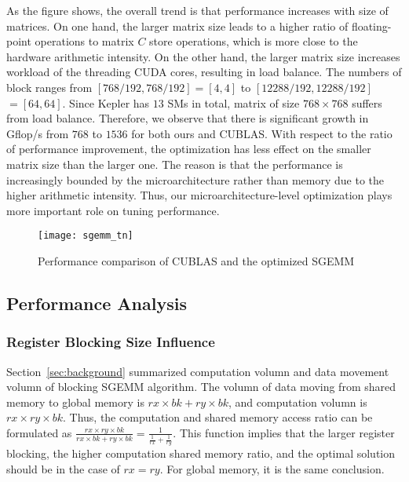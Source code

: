As the figure shows, the overall trend is that performance increases with size of matrices. On one hand, the larger 
matrix size leads to a higher ratio of floating-point operations to matrix $C$ store operations, which is more close to 
the hardware arithmetic intensity. On the other hand, the larger matrix size increases workload of the threading CUDA 
cores, resulting in load balance. The numbers of block ranges from $[768/192,768/192]=[4,4]$ to $[12288/192, 
12288/192]$ $=[64,64]$. Since Kepler has $13$ SMs in total, matrix of size $768\times 768$ suffers from load balance. 
Therefore, we observe that there is significant growth in Gflop/s from $768$ to $1536$ for both ours and CUBLAS. With 
respect to the ratio of performance improvement, the optimization has less effect on the smaller matrix size than the 
larger one. The reason is that the performance is increasingly bounded by the microarchitecture rather than memory due 
to the higher arithmetic intensity. Thus, our microarchitecture-level optimization plays more important role on tuning 
performance.

\begin{figure}[htbp]
\begin{center}
\texttt{[image: sgemm\_tn]}
\caption{Performance comparison of CUBLAS and the optimized SGEMM }
\label{fig:sgemm_tn}
\end{center}
\end{figure}

\subsection{Performance Analysis}

\subsubsection{Register Blocking Size Influence}
Section~\ref{sec:background} summarized computation volumn and data movement volumn of blocking SGEMM algorithm.
The volumn of data moving from shared memory to global memory is $rx\times bk+ ry\times bk$, and computation volumn is 
$rx\times ry\times bk$. Thus, the computation and shared memory access ratio can be formulated as $\frac {rx\times 
ry\times bk} {rx\times bk+ ry\times bk} = \frac{1}{\frac{1}{rx} + \frac{1}{ry}}$.
This function implies that the larger register blocking, the higher computation shared memory ratio, and the optimal 
solution should be in the case of $rx=ry$. 
For global memory, it is the same conclusion.

